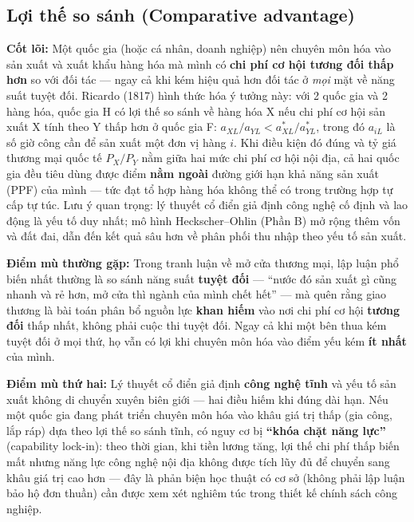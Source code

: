 \documentclass[
]{article}
\begin{document}
\subsection{Lợi thế so sánh (Comparative
advantage)}\label{lux1ee3i-thux1ebf-so-suxe1nh-comparative-advantage}

\textbf{Cốt lõi:} Một quốc gia (hoặc cá nhân, doanh nghiệp) nên chuyên
môn hóa vào sản xuất và xuất khẩu hàng hóa mà mình có \textbf{chi phí cơ
hội tương đối thấp hơn} so với đối tác --- ngay cả khi kém hiệu quả hơn
đối tác ở \emph{mọi} mặt về năng suất tuyệt đối. Ricardo (1817) hình
thức hóa ý tưởng này: với 2 quốc gia và 2 hàng hóa, quốc gia H có lợi
thế so sánh về hàng hóa X nếu chi phí cơ hội sản xuất X tính theo Y thấp
hơn ở quốc gia F: \(a_{XL}/a_{YL} < a^*_{XL}/a^*_{YL}\), trong đó
\(a_{iL}\) là số giờ công cần để sản xuất một đơn vị hàng \(i\). Khi
điều kiện đó đúng và tỷ giá thương mại quốc tế \(P_X/P_Y\) nằm giữa hai
mức chi phí cơ hội nội địa, cả hai quốc gia đều tiêu dùng được điểm
\textbf{nằm ngoài} đường giới hạn khả năng sản xuất (PPF) của mình ---
tức đạt tổ hợp hàng hóa không thể có trong trường hợp tự cấp tự túc. Lưu
ý quan trọng: lý thuyết cổ điển giả định công nghệ cố định và lao động
là yếu tố duy nhất; mô hình Heckscher--Ohlin (Phần B) mở rộng thêm vốn
và đất đai, dẫn đến kết quả sâu hơn về phân phối thu nhập theo yếu tố
sản xuất.

\textbf{Điểm mù thường gặp:} Trong tranh luận về mở cửa thương mại, lập
luận phổ biến nhất thường là so sánh năng suất \textbf{tuyệt đối} ---
``nước đó sản xuất gì cũng nhanh và rẻ hơn, mở cửa thì ngành của mình
chết hết'' --- mà quên rằng giao thương là bài toán phân bổ nguồn lực
\textbf{khan hiếm} vào nơi chi phí cơ hội \textbf{tương đối} thấp nhất,
không phải cuộc thi tuyệt đối. Ngay cả khi một bên thua kém tuyệt đối ở
mọi thứ, họ vẫn có lợi khi chuyên môn hóa vào điểm yếu kém \textbf{ít
nhất} của mình.

\textbf{Điểm mù thứ hai:} Lý thuyết cổ điển giả định \textbf{công nghệ
tĩnh} và yếu tố sản xuất không di chuyển xuyên biên giới --- hai điều
hiếm khi đúng dài hạn. Nếu một quốc gia đang phát triển chuyên môn hóa
vào khâu giá trị thấp (gia công, lắp ráp) dựa theo lợi thế so sánh tĩnh,
có nguy cơ bị \textbf{``khóa chặt năng lực''} (capability lock-in): theo
thời gian, khi tiền lương tăng, lợi thế chi phí thấp biến mất nhưng năng
lực công nghệ nội địa không được tích lũy đủ để chuyển sang khâu giá trị
cao hơn --- đây là phản biện học thuật có cơ sở (không phải lập luận bảo
hộ đơn thuần) cần được xem xét nghiêm túc trong thiết kế chính sách công
nghiệp.
\end{document}
